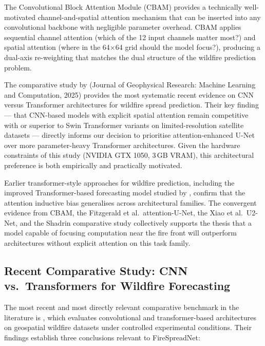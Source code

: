 The Convolutional Block Attention Module (CBAM) \citep{woo2018cbam} provides a technically well-motivated channel-and-spatial attention mechanism that can be inserted into any convolutional backbone with negligible parameter overhead.
CBAM applies sequential channel attention (which of the 12 input channels matter most?) and spatial attention (where in the 64$\times$64 grid should the model focus?), producing a dual-axis re-weighting that matches the dual structure of the wildfire prediction problem.

The comparative study by \citet{shadrin2024comparative} (Journal of Geophysical Research: Machine Learning and Computation, 2025) provides the most systematic recent evidence on CNN versus Transformer architectures for wildfire spread prediction.
Their key finding — that CNN-based models with explicit spatial attention remain competitive with or superior to Swin Transformer variants on limited-resolution satellite datasets — directly informs our decision to prioritise attention-enhanced U-Net over more parameter-heavy Transformer architectures.
Given the hardware constraints of this study (NVIDIA GTX 1050, 3\,GB VRAM), this architectural preference is both empirically and practically motivated.

Earlier transformer-style approaches for wildfire prediction, including the improved Transformer-based forecasting model studied by \citet{miao2023transformer}, confirm that the attention inductive bias generalises across architectural families.
The convergent evidence from CBAM, the Fitzgerald et al.\ attention-U-Net, the Xiao et al.\ U2-Net, and the Shadrin comparative study collectively supports the thesis that a model capable of focusing computation near the fire front will outperform architectures without explicit attention on this task family.

\subsection{Recent Comparative Study: CNN vs.\ Transformers for Wildfire Forecasting}
\label{sec:sota_cnn_vs_transformer}

The most recent and most directly relevant comparative benchmark in the literature is \citet{shadrin2024comparative}, which evaluates convolutional and transformer-based architectures on geospatial wildfire datasets under controlled experimental conditions.
Their findings establish three conclusions relevant to FireSpreadNet:

